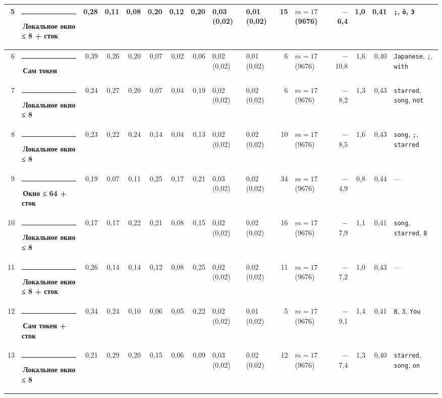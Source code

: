 \documentclass[10pt]{article}
\begin{document}
\begin{minipage}{\linewidth}
\begin{center}
{\begin{tabular}{|r|l|r|r|r|r|r|r|l|l|r|l|r|r|r|l|}
5 & \textcolor[HTML]{1BAF7A}{\rule{0.62em}{0.62em}}\,\textbf{Локальное окно ≤ 8 + сток} & 0,28 & 0,11 & 0,08 & 0,20 & 0,12 & 0,20 & 0,03 (0,02) & 0,01 (0,02) & 15 & $m{=}17$ (9676) & $-$6,4 & 1,0 & 0,41 & \texttt{\textvisiblespace{};}, \texttt{ō}, \texttt{3} \\ \hline
6 & \textcolor[HTML]{2A78D6}{\rule{0.62em}{0.62em}}\,\textbf{Сам токен} & 0,39 & 0,26 & 0,20 & 0,07 & 0,02 & 0,06 & 0,02 (0,02) & 0,01 (0,02) & 6 & $m{=}17$ (9676) & $-$10,8 & 1,6 & 0,40 & \texttt{\textvisiblespace{}Japanese}, \texttt{\textvisiblespace{};}, \texttt{\textvisiblespace{}with} \\ \hline
7 & \textcolor[HTML]{1BAF7A}{\rule{0.62em}{0.62em}}\,\textbf{Локальное окно ≤ 8} & 0,24 & 0,27 & 0,20 & 0,07 & 0,04 & 0,19 & 0,02 (0,02) & 0,02 (0,02) & 6 & $m{=}17$ (9676) & $-$8,2 & 1,3 & 0,43 & \texttt{\textvisiblespace{}starred}, \texttt{\textvisiblespace{}song}, \texttt{\textvisiblespace{}not} \\ \hline
8 & \textcolor[HTML]{1BAF7A}{\rule{0.62em}{0.62em}}\,\textbf{Локальное окно ≤ 8} & 0,23 & 0,22 & 0,24 & 0,14 & 0,04 & 0,13 & 0,02 (0,02) & 0,02 (0,02) & 10 & $m{=}17$ (9676) & $-$8,5 & 1,6 & 0,43 & \texttt{\textvisiblespace{}song}, \texttt{\textvisiblespace{};}, \texttt{\textvisiblespace{}starred} \\ \hline
9 & \textcolor[HTML]{EDA100}{\rule{0.62em}{0.62em}}\,\textbf{Окно ≤ 64 + сток} & 0,19 & 0,07 & 0,11 & 0,25 & 0,17 & 0,21 & 0,03 (0,02) & 0,02 (0,02) & 34 & $m{=}17$ (9676) & $-$4,9 & 0,8 & 0,44 & — \\ \hline
10 & \textcolor[HTML]{1BAF7A}{\rule{0.62em}{0.62em}}\,\textbf{Локальное окно ≤ 8} & 0,17 & 0,17 & 0,22 & 0,21 & 0,08 & 0,15 & 0,02 (0,02) & 0,02 (0,02) & 16 & $m{=}17$ (9676) & $-$7,9 & 1,1 & 0,41 & \texttt{\textvisiblespace{}song}, \texttt{\textvisiblespace{}starred}, \texttt{8} \\ \hline
11 & \textcolor[HTML]{1BAF7A}{\rule{0.62em}{0.62em}}\,\textbf{Локальное окно ≤ 8 + сток} & 0,26 & 0,14 & 0,14 & 0,12 & 0,08 & 0,25 & 0,02 (0,02) & 0,02 (0,02) & 11 & $m{=}17$ (9676) & $-$7,2 & 1,0 & 0,43 & — \\ \hline
12 & \textcolor[HTML]{2A78D6}{\rule{0.62em}{0.62em}}\,\textbf{Сам токен + сток} & 0,34 & 0,24 & 0,10 & 0,06 & 0,05 & 0,22 & 0,02 (0,02) & 0,01 (0,02) & 5 & $m{=}17$ (9676) & $-$9,1 & 1,4 & 0,41 & \texttt{8}, \texttt{3}, \texttt{\textvisiblespace{}You} \\ \hline
13 & \textcolor[HTML]{1BAF7A}{\rule{0.62em}{0.62em}}\,\textbf{Локальное окно ≤ 8} & 0,21 & 0,29 & 0,20 & 0,15 & 0,06 & 0,09 & 0,03 (0,02) & 0,02 (0,02) & 12 & $m{=}17$ (9676) & $-$7,4 & 1,3 & 0,40 & \texttt{\textvisiblespace{}starred}, \texttt{\textvisiblespace{}song}, \texttt{\textvisiblespace{}on} \\ \hline
\hline\end{tabular}}\end{center}
\end{minipage}
\par\vspace{0.4em}
\end{document}
